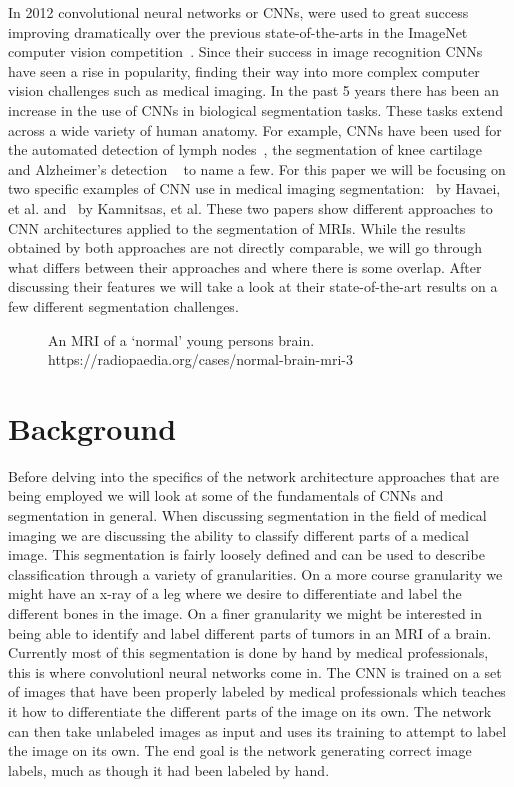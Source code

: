 \documentclass{sig-alternate}
\begin{document}
In 2012 convolutional neural networks or CNNs, were used to great success improving dramatically over the previous state-of-the-arts in the ImageNet computer vision competition~\cite{NIPS:2012}. Since their success in image recognition CNNs have seen a rise in popularity, finding their way into more complex computer vision challenges such as medical imaging. In the past 5 years there has been an increase in the use of CNNs in biological segmentation tasks. These tasks extend across a wide variety of human anatomy. For example, CNNs have been used for the automated detection of lymph nodes~\cite{Roth:2014}, the segmentation of knee cartilage~\cite{Prasoon:2013} and Alzheimer's detection ~\cite{Payan:2015} to name a few. For this paper we will be focusing on two specific examples of CNN use in medical imaging segmentation:~\cite{Havaei:2017} by Havaei, et al. and~\cite{Kamnitsas:2017} by Kamnitsas, et al. These two papers show different approaches to CNN architectures applied to the segmentation of MRIs. While the results obtained by both approaches are not directly comparable, we will go through what differs between their approaches and where there is some overlap. After discussing their features we will take a look at their state-of-the-art results on a few different segmentation challenges.

\begin{figure}
\centering
{}
\caption{An MRI of a `normal' young persons brain. https://radiopaedia.org/cases/normal-brain-mri-3}
\label{fig:brainMRI}
\end{figure}

\section{Background}
\label{sec:background}

Before delving into the specifics of the network architecture approaches that are being employed we will look at some of the fundamentals of CNNs and segmentation in general. When discussing segmentation in the field of medical imaging we are discussing the ability to classify different parts of a medical image. This segmentation is fairly loosely defined and can be used to describe classification through a variety of granularities. On a more course granularity we might have an x-ray of a leg where we desire to differentiate and label the different bones in the image. On a finer granularity we might be interested in being able to identify and label different parts of tumors in an MRI of a brain. Currently most of this segmentation is done by hand by medical professionals, this is where convolutionl neural networks come in. The CNN is trained on a set of images that have been properly labeled by medical professionals which teaches it how to differentiate the different parts of the image on its own. The network can then take unlabeled images as input and uses its training to attempt to label the image on its own. The end goal is the network generating correct image labels, much as though it had been labeled by hand. 
\end{document}
